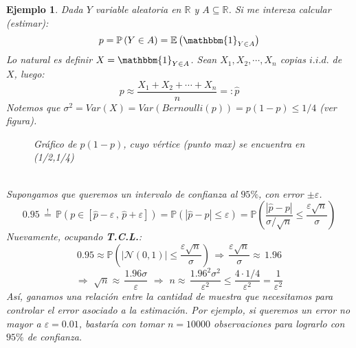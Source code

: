 \documentclass[a4paper]{article}
\newtheorem{ejemplo}{Ejemplo}
\numberwithin{equation}{subsection}
\def\R{\mathbb R}
\def\E{\mathbb E}
\newcommand{\pb}{\mathbb{P}}
\begin{document}
\begin{ejemplo}
Dada $Y$ variable aleatoria en $\R$ y $A\subseteq\R$. Si me intereza calcular (estimar):
\[p = \pb\left(Y\in A\right) = \E\left(\mathbbm{1}_{Y\in A}\right)\]
Lo natural es definir $X=\mathbbm{1}_{Y\in A}$. Sean $X_1,X_2,\cdots,X_n$ copias $i.i.d.$ de $X$, luego:
\[p\approx \frac{X_1+X_2+\cdots+X_n}{n}=:\hat{p}\]
Notemos que $\sigma^2 = Var(X) = Var(Bernoulli(p)) = p(1-p) \leq 1/4$ (ver figura).
\newline 
\begin{figure}[h!]
    \centering
    \caption{Gráfico de $p(1-p)$, cuyo vértice (punto max) se encuentra en (1/2,1/4)}
\end{figure}\\
Supongamos que queremos un intervalo de confianza al $95\%$, con error $\pm\varepsilon$.
\[0.95 \,\overset{!}{=}\,\pb\left(p\in[\hat{p}-\varepsilon\,,\,\hat{p}+\varepsilon]\right)= \pb\left(|\hat{p}-p|\leq\varepsilon\right) = \pb\left(\frac{|\hat{p}-p|}{\sigma/\sqrt{n}} \leq \frac{\varepsilon\sqrt{n}}{\sigma}\right)\]
Nuevamente, ocupando \textbf{T.C.L.}:
\[0.95\approx \pb\left(|\mathcal{N}(0,1)|\leq \frac{\varepsilon\sqrt{n}}{\sigma}\right)\,\Rightarrow
\,\frac{\varepsilon\sqrt{n}}{\sigma}\approx\,1.96\]
\[\Rightarrow\,\,\sqrt{n}\approx\,\frac{1.96\sigma}{\varepsilon}\,\,\Rightarrow\,\,n\approx\,\frac{1.96^2\sigma^2}{\varepsilon^2}\leq\frac{4\cdot 1/4}{\varepsilon^2}=\frac{1}{\varepsilon^2}\]
Así, ganamos una relación entre la cantidad de muestra que necesitamos para controlar el error asociado a la estimación. Por ejemplo, si queremos un error no mayor a $\varepsilon = 0.01$, bastaría con tomar $n=10000$ observaciones para lograrlo con $95\%$ de confianza.
\end{ejemplo}
\end{document}
